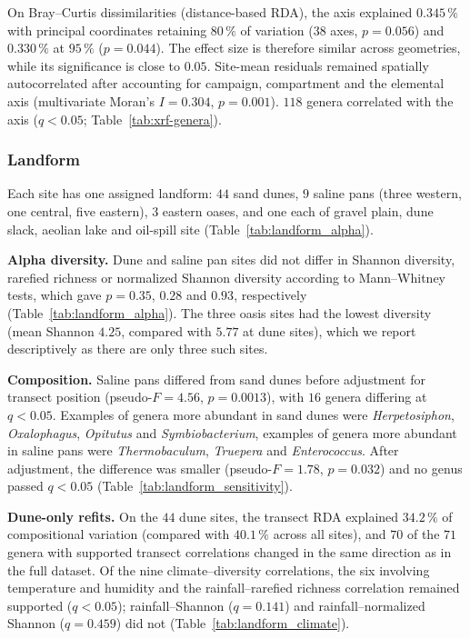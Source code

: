 \documentclass[11pt]{article}
\begin{document}
On Bray--Curtis dissimilarities (distance-based RDA), the axis explained $0.345\,\%$ with principal coordinates retaining $80\,\%$ of variation ($38$ axes, $p=0.056$) and $0.330\,\%$ at $95\,\%$ ($p=0.044$). The effect size is therefore similar across geometries, while its significance is close to $0.05$. Site-mean residuals remained spatially autocorrelated after accounting for campaign, compartment and the elemental axis (multivariate Moran's $I=0.304$, $p=0.001$). $118$ genera correlated with the axis ($q<0.05$; Table~\ref{tab:xrf-genera}).



\subsubsection{Landform}\label{sup:landform}
Each site has one assigned landform: $44$ sand dunes, $9$ saline pans (three western, one central, five eastern), $3$ eastern oases, and one each of gravel plain, dune slack, aeolian lake and oil-spill site (Table~\ref{tab:landform_alpha}).

\textbf{Alpha diversity.} Dune and saline pan sites did not differ in Shannon diversity, rarefied richness or normalized Shannon diversity according to Mann--Whitney tests, which gave $p=0.35$, $0.28$ and $0.93$, respectively (Table~\ref{tab:landform_alpha}). The three oasis sites had the lowest diversity (mean Shannon $4.25$, compared with $5.77$ at dune sites), which we report descriptively as there are only three such sites.

\textbf{Composition.} Saline pans differed from sand dunes before adjustment for transect position (pseudo-$F=4.56$, $p=0.0013$), with $16$ genera differing at $q<0.05$. Examples of genera more abundant in sand dunes were \textit{Herpetosiphon}, \textit{Oxalophagus}, \textit{Opitutus} and \textit{Symbiobacterium}, examples of genera more abundant in saline pans were \textit{Thermobaculum}, \textit{Truepera} and \textit{Enterococcus}. After adjustment, the difference was smaller (pseudo-$F=1.78$, $p=0.032$) and no genus passed $q<0.05$ (Table~\ref{tab:landform_sensitivity}).

\textbf{Dune-only refits.} On the $44$ dune sites, the transect RDA explained $34.2\,\%$ of compositional variation (compared with $40.1\,\%$ across all sites), and $70$ of the $71$ genera with supported transect correlations changed in the same direction as in the full dataset. Of the nine climate--diversity correlations, the six involving temperature and humidity and the rainfall--rarefied richness correlation remained supported ($q<0.05$); rainfall--Shannon ($q=0.141$) and rainfall--normalized Shannon ($q=0.459$) did not (Table~\ref{tab:landform_climate}).
\end{document}
